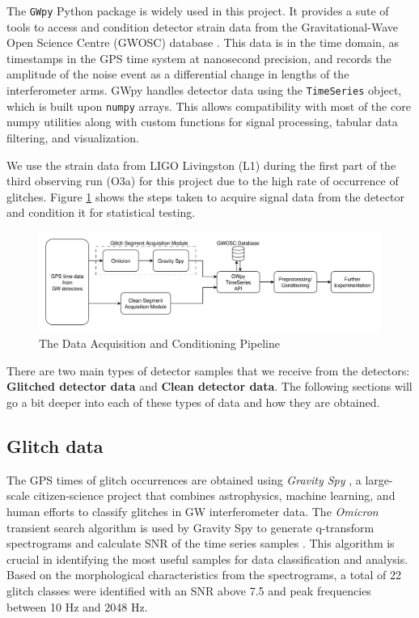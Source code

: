 \documentclass[12pt]{article}
\begin{document}
\noindent The \texttt{GWpy} Python package is widely used in this project. It provides a sute of tools to access and condition detector strain data from the Gravitational-Wave Open Science Centre (GWOSC) database \cite{gwpy}. This data is in the time domain, as timestamps in the GPS time system at nanosecond precision, and records the amplitude of the noise event as a differential change in lengths of the interferometer arms. GWpy handles detector data using the \texttt{TimeSeries} object, which is built upon \texttt{numpy} arrays. This allows compatibility with most of the core numpy utilities along with custom functions for signal processing, tabular data filtering, and visualization.

\medskip
\noindent We use the strain data from LIGO Livingston (L1) during the first part of the third observing run (O3a) for this project due to the high rate of occurrence of glitches. Figure \ref{fig:data_acq_cond} shows the steps taken to acquire signal data from the detector and condition it for statistical testing.

\begin{figure}[H]
    \centering
    \includegraphics[width=\textwidth]{images/data_acquisition_preparation.pdf}
    \caption{The Data Acquisition and Conditioning Pipeline}
    \label{fig:data_acq_cond}
\end{figure}

\medskip
\noindent There are two main types of detector samples that we receive from the detectors: \textbf{Glitched detector data} and \textbf{Clean detector data}. The following sections will go a bit deeper into each of these types of data and how they are obtained.
  
\subsection{Glitch data}

\medskip
\noindent The GPS times of glitch occurrences are obtained using \textit{Gravity Spy} \cite{Zevin_2017}, a large-scale citizen-science project that combines astrophysics, machine learning, and human efforts to classify glitches in GW interferometer data. The \textit{Omicron} transient search algorithm is used by Gravity Spy to generate q-transform spectrograms and calculate SNR of the time series samples \cite{robinet_omicron_2020}. This algorithm is crucial in identifying the most useful samples for data classification and analysis. Based on the morphological characteristics from the spectrograms, a total of 22 glitch classes were identified with an SNR above 7.5 and peak frequencies between 10 Hz and 2048 Hz.
\end{document}
